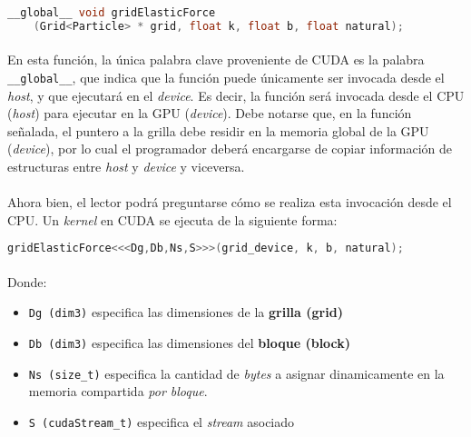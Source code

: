 \documentclass[12pt, twocolumn]{article}
\begin{document}
    \begin{lstlisting}[linewidth=\columnwidth,breaklines=true,language=C++]
    __global__ void gridElasticForce
    (Grid<Particle> * grid, float k, float b, float natural);
    \end{lstlisting}
    
    \paragraph{} En esta función, la única palabra clave proveniente de CUDA es la palabra \verb|__global__|, que indica que la función puede únicamente ser invocada desde el \textit{host}, y que ejecutará en el \textit{device}. Es decir, la función será invocada desde el CPU (\textit{host}) para ejecutar en la GPU (\textit{device}). Debe notarse que, en la función señalada, el puntero a la grilla debe residir en la memoria global de la GPU (\textit{device}), por lo cual el programador deberá encargarse de copiar información de estructuras entre \textit{host} y \textit{device} y viceversa.
    
    \paragraph{} Ahora bien, el lector podrá preguntarse cómo se realiza esta invocación desde el CPU. Un \textit{kernel} en CUDA se ejecuta de la siguiente forma:
    
    \begin{lstlisting}[linewidth=\columnwidth,breaklines=true,language=C++]
    gridElasticForce<<<Dg,Db,Ns,S>>>(grid_device, k, b, natural);
    \end{lstlisting}
    
    \paragraph{} Donde:
    
    \begin{itemize}
        \item \verb|Dg (dim3)| especifica las dimensiones de la \textbf{grilla (grid)}
        \item \verb|Db (dim3)| especifica las dimensiones del \textbf{bloque (block)}
        \item \verb|Ns (size_t)| especifica la cantidad de \textit{bytes} a asignar dinamicamente en la memoria compartida \textit{por bloque}.
        \item \verb|S (cudaStream_t)| especifica el \textit{stream} asociado
    \end{itemize}
    
\end{document}
